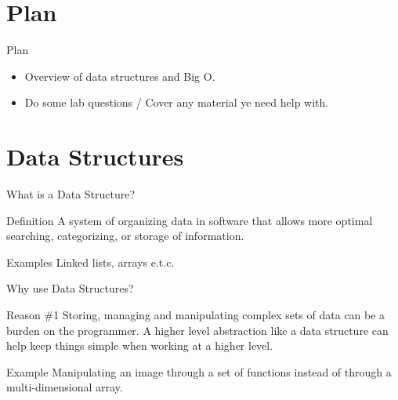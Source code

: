 \documentclass[table,xcolor=table]{IFMG-beamer}
\begin{document}

\setcounter{framenumber}{0}



\section{Plan}
\frame{\tableofcontents}

\begin{frame}{Plan}

  \begin{itemize}[<+->]
    \item Overview of data structures and Big O.
    \item Do some lab questions / Cover any material ye need help with.
  \end{itemize}
   
\end{frame}

\section{Data Structures}

\begin{frame}{What is a Data Structure?}

\begin{block}{Definition}
  A system of organizing data in software that allows more optimal searching, categorizing, or storage of information.
\end{block}

\pause%

\begin{exampleblock}{Examples}
  Linked lists, arrays e.t.c.
\end{exampleblock}
\end{frame}

\begin{frame}{Why use Data Structures?}
  \begin{block}{Reason \#1}
  Storing, managing and manipulating complex sets of data can be a burden on the programmer. A higher level abstraction like a data structure can help keep things simple when working at a higher level.
  \end{block}
  \begin{exampleblock}{Example}
    Manipulating an image through a set of functions instead of through a multi-dimensional array.
  \end{exampleblock}
\end{frame}
\end{document}
